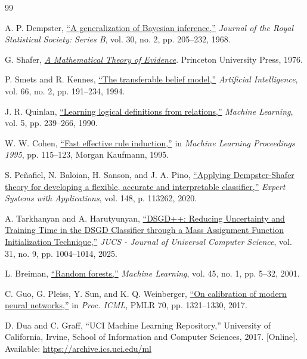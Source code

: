 \documentclass[conference]{IEEEtran}
\begin{document}
\begin{thebibliography}{99}

A. P. Dempster, \href{https://doi.org/10.1111/j.2517-6161.1968.tb00722.x}{``A generalization of Bayesian inference,''} \emph{Journal of the Royal Statistical Society: Series B}, vol. 30, no. 2, pp. 205--232, 1968.

G. Shafer, \href{https://doi.org/10.1515/9780691214696}{\emph{A Mathematical Theory of Evidence}}. Princeton University Press, 1976.

P. Smets and R. Kennes, \href{https://doi.org/10.1016/0004-3702(94)90026-4}{``The transferable belief model,''} \emph{Artificial Intelligence}, vol. 66, no. 2, pp. 191--234, 1994.

J. R. Quinlan, \href{https://doi.org/10.1007/BF00117105}{``Learning logical definitions from relations,''} \emph{Machine Learning}, vol. 5, pp. 239--266, 1990.

W. W. Cohen, \href{https://doi.org/10.1016/B978-1-55860-377-6.50023-2}{``Fast effective rule induction,''} in \emph{Machine Learning Proceedings 1995}, pp. 115--123, Morgan Kaufmann, 1995.

S. Pe\~nafiel, N. Baloian, H. Sanson, and J. A. Pino, \href{https://doi.org/10.1016/j.eswa.2020.113262}{``Applying Dempster-Shafer theory for developing a flexible, accurate and interpretable classifier,''} \emph{Expert Systems with Applications}, vol. 148, p. 113262, 2020.

A. Tarkhanyan and A. Harutyunyan, \href{https://doi.org/10.3897/jucs.164745}{``DSGD++: Reducing Uncertainty and Training Time in the DSGD Classifier through a Mass Assignment Function Initialization Technique,''} \emph{JUCS - Journal of Universal Computer Science}, vol. 31, no. 9, pp. 1004--1014, 2025.

L. Breiman, \href{https://doi.org/10.1023/A:1010933404324}{``Random forests,''} \emph{Machine Learning}, vol. 45, no. 1, pp. 5--32, 2001.

C. Guo, G. Pleiss, Y. Sun, and K. Q. Weinberger, \href{https://proceedings.mlr.press/v70/guo17a.html}{``On calibration of modern neural networks,''} in \emph{Proc. ICML}, PMLR 70, pp. 1321--1330, 2017.

D. Dua and C. Graff, ``UCI Machine Learning Repository,'' University of California, Irvine, School of Information and Computer Sciences, 2017. [Online]. Available: \url{https://archive.ics.uci.edu/ml}

\end{thebibliography}
\end{document}
